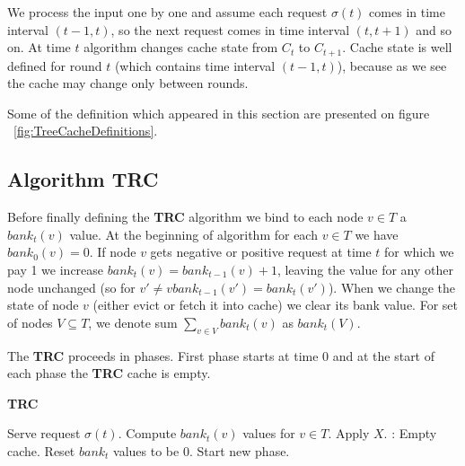 We process the input one by one and assume each request $\sigma(t)$ comes in 
time interval $(t-1, t)$, so the next request comes in time interval $(t, t + 
1)$ and so on. At time $t$ algorithm changes cache state from $C_{t}$ to 
$C_{t+1}$. Cache state is well defined for round $t$ (which contains time 
interval $(t-1, t)$), because as we see the cache may change only between 
rounds.

Some of the definition which appeared in this section are presented on figure 
~\ref{fig:TreeCacheDefinitions}.

\subsection{Algorithm TRC}

Before finally defining the \textbf{TRC} algorithm we bind to each node $v \in 
T$ a $bank_{t}(v)$ value. At the beginning of algorithm for each $v \in T$ we 
have $bank_{0}(v) = 0$. If node $v$ gets negative or positive request at 
time $t$ for which we pay 1 we increase $bank_{t}(v) = bank_{t-1}(v) + 1$, 
leaving the value for any other node unchanged (so for $v' \neq v 
bank_{t-1}(v') = bank_{t}(v')$). When we change the state of node $v$ (either 
evict or fetch it into cache) we clear its bank value. For set of nodes $V 
\subseteq T$, we denote sum $\sum_{v \in V} bank_{t}(v)$ as $bank_{t}(V)$.

The \textbf{TRC} proceeds in phases. First phase starts at time 0 and at the 
start of each phase the \textbf{TRC} cache is empty. 
\begin{algorithm}
\caption{\textbf{TRC}}
\label{alg:TRC}
\begin{algorithmic}[1]
  \State Serve request $\sigma(t)$.
  \State Compute $bank_t(v)$ values for $v \in T$.
 \State Apply $X$.
 :
  \State Empty cache.
  \State Reset $bank_t$ values to be 0.
  \State Start new phase.
 \EndIf
 \EndIf
\EndFor
  \end{algorithmic}
\end{algorithm}

